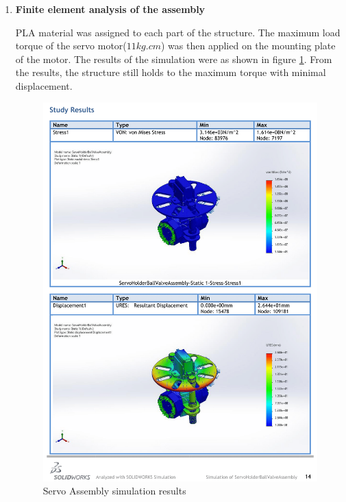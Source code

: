 \begin{enumerate}
\begin{enumerate}
     \par
     \item \textbf{Finite element analysis of the assembly}
     \par
     PLA material was assigned to each part of the structure. The maximum load torque of the servo motor($11kg.cm$) was then applied on the mounting plate of the motor. The results of the simulation were as shown in figure \ref{fig:servo_assembly_results}. From the results, the structure still holds to the maximum torque with minimal displacement.
     \begin{figure}[H]
         \centering
         \includegraphics[width=\textwidth]{Figures/ServoHolderBallValveAssembly-Static-1-1-1.png}
         \caption{Servo Assembly simulation results}
         \label{fig:servo_assembly_results}
     \end{figure}
    \end{enumerate}
\end{enumerate}

